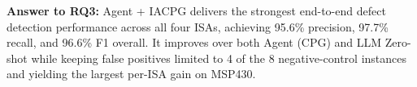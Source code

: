 \documentclass[a4paper,UKenglish,cleveref, autoref, thm-restate]{lipics-v2021}
\begin{document}
\begin{rqbox}
\textbf{Answer to RQ3:}
Agent + IACPG delivers the strongest end-to-end defect detection performance across all four ISAs, achieving 95.6\% precision, 97.7\% recall, and 96.6\% F1 overall. It improves over both Agent (CPG) and LLM Zero-shot while keeping false positives limited to 4 of the 8 negative-control instances and yielding the largest per-ISA gain on MSP430.
\end{rqbox}

\end{document}
